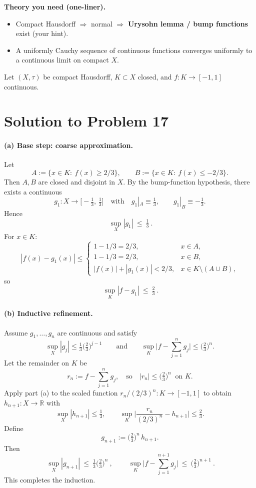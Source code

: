 \documentclass[12pt,a4paper]{article}
\theoremstyle{plain}
\theoremstyle{definition}
\theoremstyle{remark}
\theoremstyle{remark}
\begin{document}
	\bigskip
	\noindent\textbf{Theory you need (one-liner).}
	\begin{itemize}
		\item Compact Hausdorff $\Rightarrow$ normal $\Rightarrow$ \textbf{Urysohn lemma / bump functions} exist (your hint).
		\item A uniformly Cauchy sequence of continuous functions converges uniformly to a continuous limit on compact $X$.
	\end{itemize}
	
	Let $(X,\tau)$ be compact Hausdorff, $K\subset X$ closed, and $f:K\to[-1,1]$ continuous.
	
\section*{Solution to Problem 17}

\paragraph{(a) Base step: coarse approximation.}
Let
\[
A:=\{x\in K:\ f(x)\ge 2/3\},\qquad B:=\{x\in K:\ f(x)\le -2/3\}.
\]
Then $A,B$ are closed and disjoint in $X$. By the bump-function hypothesis, there exists a continuous
\[
g_1:X\longrightarrow\Big[-\tfrac{1}{3},\,\tfrac{1}{3}\Big]
\quad\text{with}\quad
g_1|_A\equiv\tfrac{1}{3},\qquad g_1|_B\equiv -\tfrac{1}{3}.
\]
Hence
\[
\boxed{\ \sup_X |g_1|\ \le\ \tfrac{1}{3}\ }.
\]
For $x\in K$:
\[
|f(x)-g_1(x)|\le
\begin{cases}
	1-1/3=2/3,& x\in A,\\
	1-1/3=2/3,& x\in B,\\
	|f(x)|+|g_1(x)|<2/3,& x\in K\setminus(A\cup B),
\end{cases}
\]
so
\[
\boxed{\ \sup_{K}|f-g_1|\ \le\ \tfrac{2}{3}\ }.
\]

\medskip

\paragraph{(b) Inductive refinement.}
Assume $g_1,\dots,g_n$ are continuous and satisfy
\[
\sup_X|g_j|\le \tfrac{1}{3}\Big(\tfrac{2}{3}\Big)^{j-1}
\qquad\text{and}\qquad
\sup_K\Big|f-\sum_{j=1}^n g_j\Big|\le \Big(\tfrac{2}{3}\Big)^n.
\]
Let the remainder on $K$ be
\[
r_n:=f-\sum_{j=1}^n g_j,
\quad\text{so}\quad
|r_n|\le \Big(\tfrac{2}{3}\Big)^n \ \text{ on }K.
\]
Apply part (a) to the scaled function $r_n/(2/3)^n:K\to[-1,1]$ to obtain
$h_{n+1}:X\to\mathbb R$ with
\[
\sup_X|h_{n+1}|\le\tfrac{1}{3},
\qquad
\sup_K\Big|\frac{r_n}{(2/3)^n}-h_{n+1}\Big|\le \tfrac{2}{3}.
\]
Define
\[
g_{n+1}:=\Big(\tfrac{2}{3}\Big)^n\,h_{n+1}.
\]
Then
\[
\boxed{\ \sup_X|g_{n+1}|\ \le\ \tfrac{1}{3}\Big(\tfrac{2}{3}\Big)^n\ },
\qquad
\boxed{\ \sup_K\Big|f-\sum_{j=1}^{n+1} g_j\Big|\ \le\ \Big(\tfrac{2}{3}\Big)^{n+1}\ }.
\]
This completes the induction.
\end{document}
